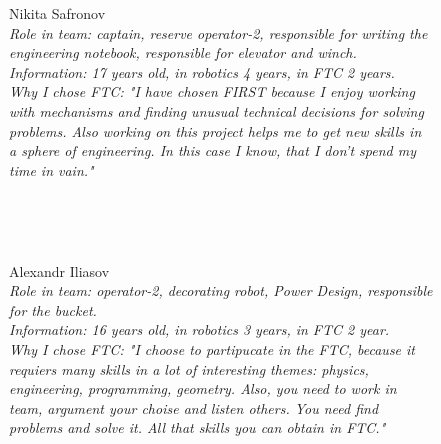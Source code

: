 \begin{figure}[H]
	\begin{minipage}{0.47\linewidth}
		Nikita Safronov\\
		\emph{Role in team: captain, reserve operator-2, responsible for writing the engineering notebook, responsible for elevator and winch.\\}
		\emph{Information: 17 years old, in robotics 4 years, in FTC 2 years.\\} 
		\emph{Why I chose FTC: "I have chosen FIRST because I enjoy working with mechanisms and finding unusual technical decisions for solving problems. Also working on this project helps me to get new skills in a sphere of engineering. In this case I know, that I don't spend my time in vain."}				
	\end{minipage}
	\hfill
	\begin{minipage}{0.47\linewidth}
		\\
	\end{minipage}
\end{figure}

\begin{figure}[H]
	\begin{minipage}[h]{0.47\linewidth}
		\\
	\end{minipage}
	\hfill
	\begin{minipage}[h]{0.47\linewidth}
		Alexandr Iliasov \\
		\emph{Role in team: operator-2, decorating robot, Power Design, responsible for the bucket.\\}
		\emph{Information: 16 years old, in robotics 3 years, in FTC 2 year. \\}
		\emph{Why I chose FTC: "I choose to partipucate in the FTC, because it requiers many skills in a lot of interesting themes: physics, engineering, programming, geometry. Also, you need to work in team, argument your choise and listen others. You need find problems and solve it. All that skills you can obtain in FTC."}		
	\end{minipage}
	\vfill
\end{figure}

